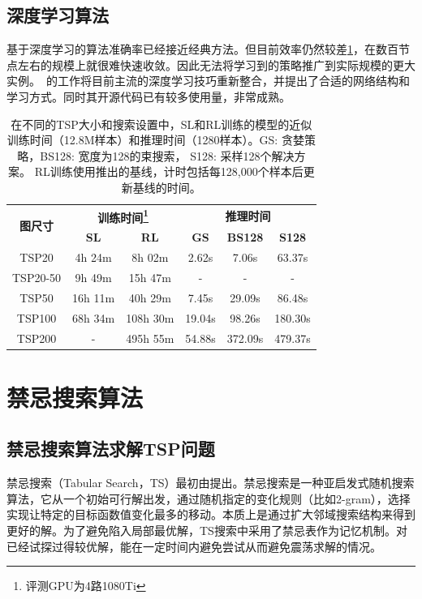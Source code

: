\documentclass[lang=cn,11pt]{elegantpaper}
\begin{document}
\subsection{深度学习算法}
基于深度学习的算法准确率已经接近经典方法。但目前效率仍然较差\ref{tab:timingindeeplerarning}，在数百节点左右的规模上就很难快速收敛。因此无法将学习到的策略推广到实际规模的更大实例。~\cite{goodDLforTSP}的工作将目前主流的深度学习技巧重新整合，并提出了合适的网络结构和学习方式。同时其开源代码已有较多使用量，非常成熟。
\begin{table}[ht]
    \centering
    \caption{在不同的TSP大小和搜索设置中，SL和RL训练的模型的近似训练时间（12.8M样本）和推理时间（1280样本）。GS: 贪婪策略，BS128: 宽度为128的束搜索， S128: 采样128个解决方案。 RL训练使用推出的基线，计时包括每128,000个样本后更新基线的时间。} 
    \label{tab:timingindeeplerarning}
    \begin{tabular}{cccccc}
        \toprule
        \multirow{2}{*}{\textbf{图尺寸}} & \multicolumn{2}{c}{\textbf{训练时间\footnote{评测GPU为4路1080Ti}}} & \multicolumn{3}{c}{\textbf{推理时间}} \\
         & \textbf{SL} & \textbf{RL} & \textbf{GS} & \textbf{BS128} & \textbf{S128} \\
        \midrule
        \midrule
        TSP20 & 4h 24m & 8h 02m & 2.62s & 7.06s & 63.37s \\
        TSP20-50 & 9h 49m & 15h 47m & - & - & - \\
        TSP50 & 16h 11m & 40h 29m & 7.45s & 29.09s & 86.48s \\
        TSP100 & 68h 34m & 108h 30m & 19.04s & 98.26s & 180.30s \\
        TSP200 & - & 495h 55m & 54.88s & 372.09s & 479.37s \\
        \bottomrule
    \end{tabular}
\end{table}





\section{禁忌搜索算法}
\subsection{禁忌搜索算法求解TSP问题}
禁忌搜索（Tabular Search，TS）最初由\cite{tabusearch}提出。禁忌搜索是一种亚启发式随机搜索算法，它从一个初始可行解出发，通过随机指定的变化规则（比如2-gram），选择实现让特定的目标函数值变化最多的移动。本质上是通过扩大邻域搜索结构来得到更好的解。为了避免陷入局部最优解，TS搜索中采用了禁忌表作为记忆机制。对已经试探过得较优解，能在一定时间内避免尝试从而避免震荡求解的情况。
\end{document}
